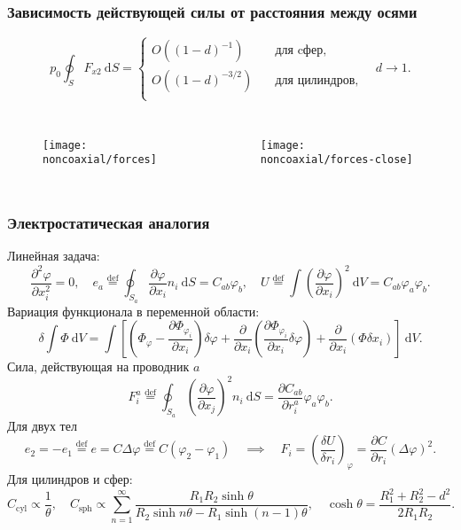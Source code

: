 \documentclass[mathserif]{beamer} %
\newcommand{\eqdef}{\overset{\mathrm{def}}{=}}
\newcommand{\dd}{\:\mathrm{d}}
\newcommand{\pder}[2][]{\frac{\partial#1}{\partial#2}}
\newcommand{\pderdual}[2][]{\frac{\partial^2#1}{\partial#2^2}}
\newcommand{\OO}[1]{O(#1)}
\renewcommand{\phi}{\varphi}
\begin{document}
\begin{frame}
    \frametitle{Зависимость действующей силы от расстояния между осями}
    \vspace{-.5cm}
    \[ p_0 \oint_S F_{x2}\dd{S} = \begin{cases}
        \OO{(1-d)^{-1}} & \quad\text{для cфер}, \\
        \OO{(1-d)^{-3/2}} & \quad\text{для цилиндров}, \\
        \end{cases} \quad d\to1. \]
    \vspace{-.7cm}
    \begin{columns}
        \begin{figure}
            \texttt{[image: noncoaxial/forces]}
        \end{figure}
        \begin{figure}
            \texttt{[image: noncoaxial/forces-close]}
        \end{figure}
    \end{columns}
\end{frame}

\begin{frame}
    \frametitle{Электростатическая аналогия}
    \footnotesize
    Линейная задача:
    \begin{equation*}
        \pderdual[\phi]{x_i} = 0, \quad
        e_a \eqdef \oint_{S_a} \pder[\phi]{x_i}n_i\dd{S} = C_{ab} \phi_b, \quad %
        U \eqdef \int \left(\pder[\phi]{x_i}\right)^2\dd{V} = C_{ab} \phi_a \phi_b.
    \end{equation*}
    Вариация функционала в переменной области:
    \begin{equation*}
        \delta \int \Phi \dd{V} = \int \left[
            \left( \Phi_\phi - \pder[\Phi_{\phi_i}]{x_i} \right) \delta\phi +
            \pder{x_i}\left( \pder[\Phi_{\phi_i}]{x_i} \delta\phi \right) +
            \pder{x_i}\left( \Phi \delta x_i \right)
        \right]\dd{V}.
    \end{equation*}
    Сила, действующая на проводник \(a\)
    \begin{equation*}
        F^a_i \eqdef \oint_{S_a} \left(\pder[\phi]{x_j}\right)^2 n_i\dd{S} = \pder[C_{ab}]{r^a_i} \phi_a \phi_b.
    \end{equation*}
    Для двух тел
    \begin{equation*}
        e_2 = -e_1 \eqdef e = C\Delta\phi \eqdef C(\phi_2 - \phi_1) \quad\implies\quad
        F_i = \left(\frac{\delta U}{\delta r_i}\right)_\phi = \pder[C]{r_i}(\Delta\phi)^2.
    \end{equation*}
    Для цилиндров и сфер:
    \begin{equation*}
        C_\mathrm{cyl} \propto \frac1{\theta}, \quad
        C_\mathrm{sph} \propto  \sum_{n=1}^\infty \frac{R_1 R_2 \sinh\theta} {R_2\sinh n\theta - R_1\sinh (n-1)\theta},
        \quad \cosh\theta = \frac{R_1^2 + R_2^2 - d^2}{2 R_1 R_2}.
    \end{equation*}
\end{frame}
\end{document}
